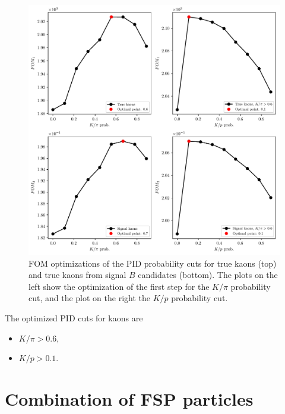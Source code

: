 \begin{figure}[H]
\centering
\captionsetup{width=.8\linewidth}
\includegraphics[width=\linewidth]{fig/FSP_kaon_fom}
\caption{$\mathrm{FOM}$ optimizations of the PID probability cuts for true kaons (top) and true kaons from signal $B$ candidates (bottom). The plots on the left show the optimization of the first step for the $K / \pi$ probability cut, and the plot on the right the $K/p$ probability cut.}
\label{fig:Kfom}
\end{figure}

The optimized PID cuts for kaons are
\begin{itemize}
\item $K/\pi > 0.6$,
\item $K/p > 0.1$.
\end{itemize}

\section{Combination of FSP particles}

